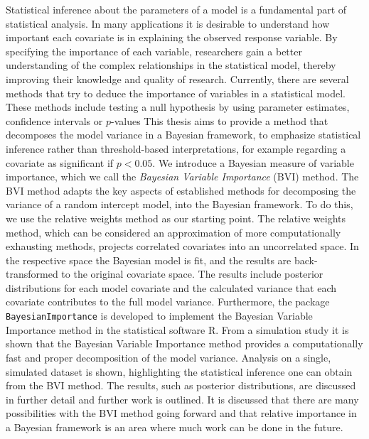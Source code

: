 Statistical inference about the parameters of a model is a fundamental part of statistical analysis. 
In many applications it is desirable to understand how important each covariate is in explaining the observed response variable.
By specifying the importance of each variable, researchers gain a better understanding of the complex relationships in the statistical model, thereby improving their knowledge and quality of research.
Currently, there are several methods that try to deduce the importance of variables in a statistical model.
These methods include testing a null hypothesis by using parameter estimates, confidence intervals or $p$-values
This thesis aims to provide a method that decomposes the model variance in a Bayesian framework, to emphasize statistical inference rather than threshold-based interpretations, for example regarding a covariate as significant if $p<0.05$.
\newline
\newline 
We introduce a Bayesian measure of variable importance, which we call the \textit{Bayesian Variable Importance} (BVI) method. 
The BVI method adapts the key aspects of established methods for decomposing the variance of a random intercept model, into the Bayesian framework.
To do this, we use the relative weights method as our starting point.
The relative weights method, which can be considered an approximation of more computationally exhausting methods, projects correlated covariates into an uncorrelated space.
In the respective space the Bayesian model is fit, and the results are back-transformed to the original covariate space. 
The results include posterior distributions for each model covariate and the calculated variance that each covariate contributes to the full model variance. 
Furthermore, the package \texttt{BayesianImportance} is developed to implement the Bayesian Variable Importance method in the statistical software R.
\newline 
\newline 
From a simulation study it is shown that the Bayesian Variable Importance method provides a computationally fast and proper decomposition of the model variance.
Analysis on a single, simulated dataset is shown, highlighting the statistical inference one can obtain from the BVI method.
The results, such as posterior distributions, are discussed in further detail and further work is outlined.
It is discussed that there are many possibilities with the BVI method going forward and that relative importance in a Bayesian framework is an area where much work can be done in the future. 


